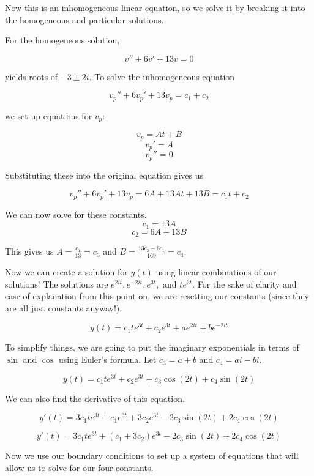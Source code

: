 \documentclass[11pt,answers]{exam}
\begin{document}
\begin{questions}
\begin{solution}
Now this is an inhomogeneous linear equation, so we solve it by breaking it into the homogeneous and particular solutions.

For the homogeneous solution,

\[
v'' + 6v' + 13v = 0
\]

yields roots of $-3 \pm 2i$. To solve the inhomogeneous equation

\[
v_{p}'' + 6v_{p}' + 13v_{p} = c_{1} + c_{2}
\]

we set up equations for $v_{p}$:

\[
v_{p} = At + B
\]
\[
v_{p}' = A
\]
\[
v_{p}'' = 0
\]

Substituting these into the original equation gives us

\[
v_{p}'' + 6v_{p}' + 13v_{p} = 6A + 13At + 13B = c_{1}t + c_{2}
\]

We can now solve for these constants.
\[
c_{1} = 13A
\]
\[
c_{2} = 6A + 13B
\]

This gives us $A = \frac{c_{1}}{13} = c_{3}$ and $B = \frac{13c_{2}-6c_{1}}{169} = c_{4}$. 

Now we can create a solution for $y(t)$ using linear combinations of our solutions! The solutions are $e^{2it}, e^{-2it}, e^{3t},$ and $te^{3t}$. For the sake of clarity and ease of explanation from this point on, we are resetting our constants (since they are all just constants anyway!).

\begin{equation}
y(t) = c_{1} t e^{3t} + c_{2}e^{3t} + ae^{2it} + be^{-2it}
\end{equation}

To simplify things, we are going to put the imaginary exponentials in terms of $\sin$ and $\cos$ using Euler's formula. Let $c_{3} = a + b$ and $c_{4} = ai - bi$.

\begin{equation}
y(t) = c_{1} t e^{3t} + c_{2}e^{3t} + c_{3}\cos{(2t)} + c_{4}\sin{(2t)}
\end{equation}

We can also find the derivative of this equation.

\begin{equation}
y'(t) = 3 c_{1} t e^{3t} + c_{1}e^{3t} + 3c_{2}e^{3t} - 2 c_{3}\sin{(2t)} + 2c_{4}\cos{(2t)} 
\end{equation}

\[
y'(t) = 3 c_{1} t e^{3t} + (c_{1} + 3c_{2})e^{3t} - 2 c_{3}\sin{(2t)} + 2c_{4}\cos{(2t)}
\]

Now we use our boundary conditions to set up a system of equations that will allow us to solve for our four constants.


\end{solution}
\end{questions}
\end{document}
